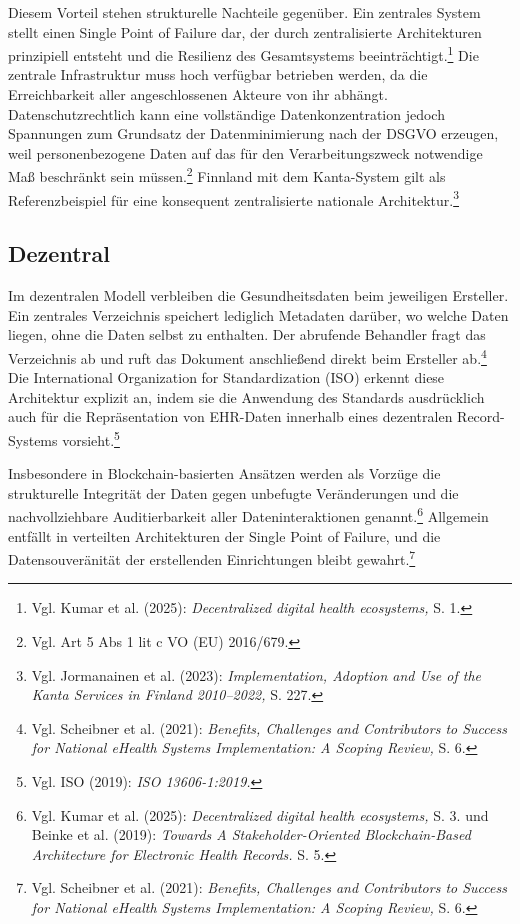 Diesem Vorteil stehen strukturelle Nachteile gegenüber. Ein zentrales System stellt einen Single Point of Failure dar, der durch zentralisierte Architekturen prinzipiell entsteht und die Resilienz des Gesamtsystems beeinträchtigt.\footnote{Vgl. Kumar et al. (2025): \textit{Decentralized digital health ecosystems,} S. 1.} Die zentrale Infrastruktur muss hoch verfügbar betrieben werden, da die Erreichbarkeit aller angeschlossenen Akteure von ihr abhängt. Datenschutzrechtlich kann eine vollständige Datenkonzentration jedoch Spannungen zum Grundsatz der Datenminimierung nach der DSGVO erzeugen, weil personenbezogene Daten auf das für den Verarbeitungszweck notwendige Maß beschränkt sein müssen.\footnote{Vgl. Art 5 Abs 1 lit c VO (EU) 2016/679.} Finnland mit dem Kanta-System gilt als Referenzbeispiel für eine konsequent zentralisierte nationale Architektur.\footnote{Vgl. Jormanainen et al. (2023): \textit{Implementation, Adoption and Use of the Kanta Services in Finland 2010–2022,} S. 227.}


    \subsection{Dezentral}
Im dezentralen Modell verbleiben die Gesundheitsdaten beim jeweiligen Ersteller. Ein zentrales Verzeichnis speichert lediglich Metadaten darüber, wo welche Daten liegen, ohne die Daten selbst zu enthalten. Der abrufende Behandler fragt das Verzeichnis ab und ruft das Dokument anschließend direkt beim Ersteller ab.\footnote{Vgl. Scheibner et al. (2021): \textit{Benefits, Challenges and Contributors to Success for National eHealth Systems Implementation: A Scoping Review,} S. 6.} Die International Organization for Standardization (ISO) erkennt diese Architektur explizit an, indem sie die Anwendung des Standards ausdrücklich auch für die Repräsentation von EHR-Daten innerhalb eines dezentralen Record-Systems vorsieht.\footnote{Vgl. ISO (2019): \textit{ISO 13606-1:2019.}}

Insbesondere in Blockchain-basierten Ansätzen werden als Vorzüge die strukturelle Integrität der Daten gegen unbefugte Veränderungen und die nachvollziehbare Auditierbarkeit aller Dateninteraktionen genannt.\footnote{Vgl. Kumar et al. (2025): \textit{Decentralized digital health ecosystems,} S. 3. und Beinke et al. (2019): \textit{Towards A Stakeholder-Oriented Blockchain-Based Architecture for Electronic Health Records.} S. 5.}
Allgemein entfällt in verteilten Architekturen der Single Point of Failure, und die Datensouveränität der erstellenden Einrichtungen bleibt gewahrt.\footnote{Vgl. Scheibner et al. (2021): \textit{Benefits, Challenges and Contributors to Success for National eHealth Systems Implementation: A Scoping Review,} S. 6.}


